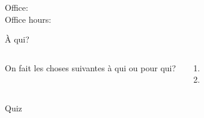 \documentclass{beamer}
\subtitle[Meubles et objets indirects]{Les meubles et les pronoms compléments d'objet indirect}
\begin{document}
  \begin{frame}
    \titlepage
    \tiny{Office: \\
          Office hours: }
  \end{frame}

  \begin{frame}{À qui?}
    \begin{columns}
        \scriptsize
        On fait les choses suivantes à qui ou pour qui?
        \begin{enumerate}
          \item 
          \item<2->[$\to$] 
        \end{enumerate}
        \begin{minipage}[t][0.6\textheight]{\linewidth}
          \begin{center}
          \end{center}
        \end{minipage}
    \end{columns}
  \end{frame}

  \begin{frame}{}
    \begin{center}
      \Large Quiz
    \end{center}
  \end{frame}
\end{document}
